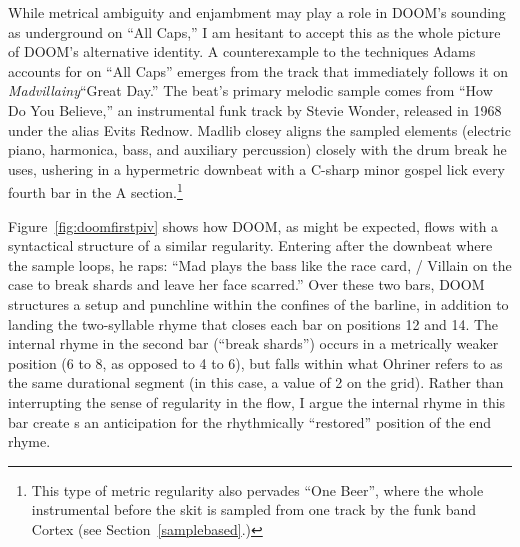 While metrical ambiguity and enjambment may play a role in DOOM's sounding as underground
on ``All Caps,'' I am hesitant to accept this as the whole picture of DOOM's alternative 
identity. A counterexample to the techniques Adams accounts for on ``All Caps'' emerges from
the track that immediately follows it on  \textit{Madvillainy}\textemdash ``Great Day.'' The 
beat's primary melodic sample comes from ``How Do You Believe,'' an instrumental funk track 
by Stevie Wonder, released in 1968 under the alias Evits Rednow. Madlib closey aligns the 
sampled elements (electric piano, harmonica, bass, and auxiliary percussion) closely with 
the drum break he uses, ushering in a hypermetric downbeat with a C-sharp minor gospel lick
every fourth bar in the A section.\footnote{
    This type of metric regularity also pervades ``One Beer'', where the whole
    instrumental before the skit is sampled from one track by the funk band Cortex 
    (see Section~\ref{samplebased}.)}

Figure~\ref{fig:doomfirstpiv} shows how DOOM, as might be expected, flows with a syntactical
structure of a  similar regularity. Entering after the downbeat where the sample loops, he 
raps: ``Mad plays the bass  like the race card, / Villain on the case to break shards and 
leave her face scarred.'' Over these two  bars, DOOM structures a setup and punchline within
the confines of the barline, in addition to landing the two-syllable rhyme that closes each bar
on positions 12 and 14. The internal rhyme in the second bar (``break shards'') occurs in a 
metrically weaker position (6 to 8, as opposed to 4 to 6), but falls within what Ohriner refers
to as the same durational segment (in this case, a value of 2 on the grid). Rather than 
interrupting the sense of regularity in the flow, I argue the internal rhyme in this bar create
s an anticipation for the rhythmically ``restored'' position of the end rhyme.


